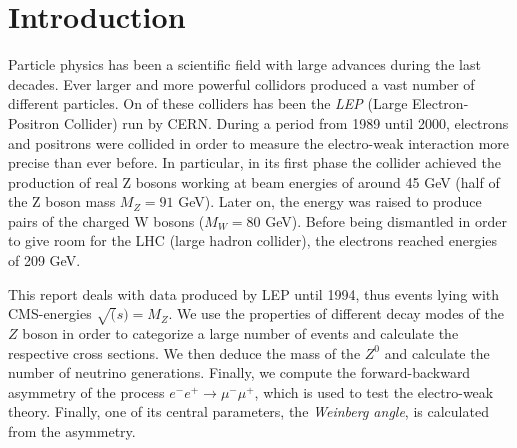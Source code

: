 \section{Introduction}

Particle physics has been a scientific field with large advances 
during the last decades. Ever larger and more powerful collidors 
produced a vast number of different particles. On of these colliders 
has been the \emph{LEP} (Large Electron-Positron Collider) run by CERN.
During a period from 1989 until 2000, electrons and positrons were 
collided in order to measure the electro-weak interaction more precise 
than ever before. In particular, in its first phase the collider 
achieved the production of real Z bosons working at beam energies of 
around 45 GeV (half of the Z boson mass $M_Z = 91$ GeV). Later on, 
the energy was raised to produce pairs of the charged W bosons 
($M_W = 80$ GeV). Before being dismantled in order to give room 
for the LHC (large hadron collider), the electrons reached energies 
of 209 GeV. 

This report deals with data produced by LEP until 1994, thus events 
lying with CMS-energies $\sqrt(s) = M_Z$. We use the properties of 
different decay modes of the $Z$ boson in order to categorize a 
large number of events and calculate the respective cross sections. 
We then deduce the mass of the $Z^0$ and calculate the number of 
neutrino generations. Finally, we compute the forward-backward 
asymmetry of the process $e^-e^+ \to \mu^-\mu^+$, which is used 
to test the electro-weak theory. Finally, one of its central 
parameters, the \emph{Weinberg angle}, is calculated from the 
asymmetry. 
